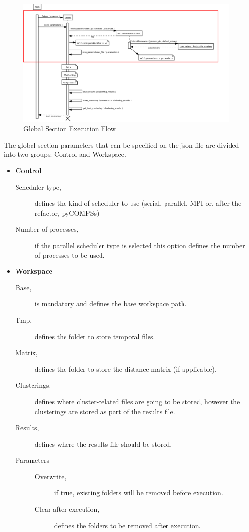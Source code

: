 \begin{landscape}
\begin{figure}
\includegraphics[width=25cm]{img/global_sequence_driver.jpg}
\caption{Global Section Execution Flow}
\end{figure}
\end{landscape}



The global section parameters that can be specified on the json file are divided into two groups: Control and Workspace. 

\begin{itemize}
\item \textbf{Control}
\begin{description}
\item [Scheduler type,] defines the kind of scheduler to use (serial, parallel, MPI or, after the refactor, pyCOMPSs)
\item [Number of processes,] if the parallel scheduler type is selected this option defines the number of processes to be used.
\end{description}
\item \textbf{Workspace}
\begin{description}
\item [Base,] is mandatory and defines the base workspace path.
\item [Tmp,] defines the folder to store temporal files.
\item [Matrix,] defines the folder to store the distance matrix (if applicable).
\item [Clusterings,] defines where cluster-related files are going to be stored, however the clusterings are stored as part of the results file.
\item [Results,] defines where the results file should be stored.
\item [Parameters:] \hfill
\begin{description}
\item [Overwrite,] if true, existing folders will be removed before execution.
\item [Clear after execution,] defines the folders to be removed after execution.
\end{description}
\end{description}
\end{itemize}


